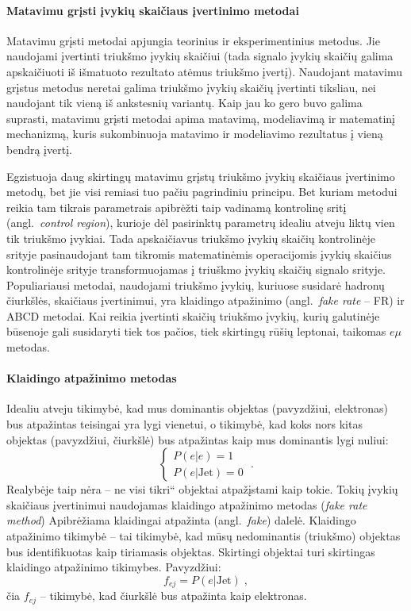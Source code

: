 \documentclass[a4paper, 12pt]{article}
\newcommand{\ltq}[1]{{\quotedblbase{}#1\textquotedblleft{}}}
\newlength\q
\begin{document}
\paragraph{Matavimu grįsti įvykių skaičiaus įvertinimo metodai\\}

Matavimu grįsti metodai apjungia teorinius ir eksperimentinius metodus. Jie naudojami įvertinti triukšmo įvykių skaičiui (tada signalo įvykių skaičių galima apskaičiuoti iš išmatuoto rezultato atėmus triukšmo įvertį). Naudojant matavimu grįstus metodus neretai galima triukšmo įvykių skaičių įvertinti tiksliau, nei naudojant tik vieną iš ankstesnių variantų. Kaip jau ko gero buvo galima suprasti, matavimu grįsti metodai apima matavimą, modeliavimą ir matematinį mechanizmą, kuris sukombinuoja matavimo ir modeliavimo rezultatus į vieną bendrą įvertį.

Egzistuoja daug skirtingų matavimu grįstų triukšmo įvykių skaičiaus įvertinimo metodų, bet jie visi remiasi tuo pačiu pagrindiniu principu. Bet kuriam metodui reikia tam tikrais parametrais apibrėžti taip vadinamą kontrolinę sritį (angl.\ \textit{control region}), kurioje dėl pasirinktų parametrų idealiu atveju liktų vien tik triukšmo įvykiai. Tada apskaičiavus triukšmo įvykių skaičių kontrolinėje srityje pasinaudojant tam tikromis matematinėmis operacijomis įvykių skaičius kontrolinėje srityje transformuojamas į triuškmo įvykių skaičių signalo srityje. Populiariausi metodai, naudojami triukšmo įvykių, kuriuose susidarė hadronų čiurkšlės, skaičiaus įvertinimui, yra klaidingo atpažinimo (angl.\ \textit{fake rate} -- FR) ir ABCD metodai. Kai reikia įvertinti skaičių triukšmo įvykių, kurių galutinėje būsenoje gali susidaryti tiek tos pačios, tiek skirtingų rūšių leptonai, taikomas $e\mu$ metodas.

\paragraph{Klaidingo atpažinimo metodas\\}
Idealiu atveju tikimybė, kad mus dominantis objektas (pavyzdžiui, elektronas) bus atpažintas teisingai yra lygi vienetui, o tikimybė, kad koks nors kitas objektas (pavyzdžiui, čiurkšlė) bus atpažintas kaip mus dominantis lygi nuliui:
\begin{equation}
\begin{cases}
P(e|e)=1\\
P(e|\mathrm{Jet})=0
\end{cases} \; .
\label{eq:rfprob}
\end{equation}
Realybėje taip nėra -- ne visi \ltq{tikri} objektai atpažįstami kaip tokie. Tokių įvykių skaičiaus įvertinimui naudojamas klaidingo atpažinimo metodas (\textit{fake rate method}) Apibrėžiama klaidingai atpažinta (angl.\ \textit{fake}) dalelė. Klaidingo atpažinimo tikimybė -- tai tikimybė, kad mūsų nedominantis (triukšmo) objektas bus identifikuotas kaip tiriamasis objektas. Skirtingi objektai turi skirtingas klaidingo atpažinimo tikimybes. Pavyzdžiui:
\begin{equation}
f_{ej}=P(e|\mathrm{Jet}) \; \mathrm{,}
\label{eq:fr}
\end{equation}
čia $f_{ej}$ -- tikimybė, kad čiurkšlė bus atpažinta kaip elektronas.
\end{document}
